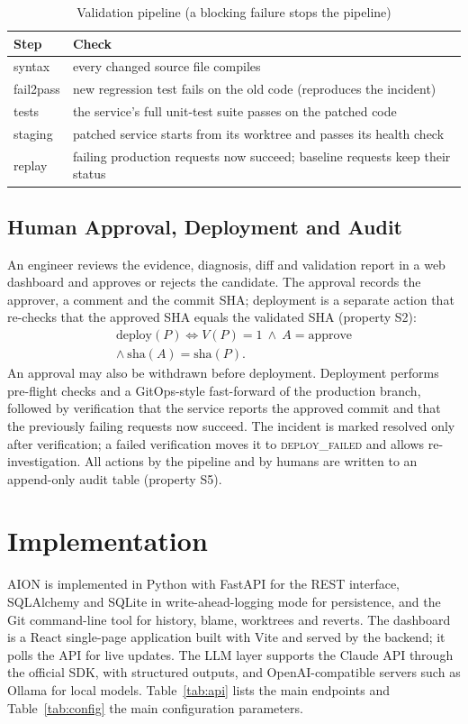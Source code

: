 \documentclass[conference]{IEEEtran}
\begin{document}
\begin{table}[t]
\centering
\caption{Validation pipeline (a blocking failure stops the pipeline)}
\label{tab:valsteps}
\footnotesize
\begin{tabular}{@{}p{2.0cm}p{5.7cm}@{}}
\toprule
Step & Check \\
\midrule
syntax & every changed source file compiles \\
fail2pass & new regression test fails on the old code (reproduces the incident) \\
tests & the service's full unit-test suite passes on the patched code \\
staging & patched service starts from its worktree and passes its health check \\
replay & failing production requests now succeed; baseline requests keep their status \\
\bottomrule
\end{tabular}
\end{table}

\subsection{Human Approval, Deployment and Audit}
\label{sec:deploy}
An engineer reviews the evidence, diagnosis, diff and validation report in a web dashboard and approves or rejects the candidate. The approval records the approver, a comment and the commit SHA; deployment is a separate action that re-checks that the approved SHA equals the validated SHA (property S2):
\begin{multline}
\text{deploy}(P) \iff V(P)=1 \ \wedge\ A=\text{approve} \\
\wedge\ \text{sha}(A)=\text{sha}(P).
\end{multline}
An approval may also be withdrawn before deployment. Deployment performs pre-flight checks and a GitOps-style fast-forward of the production branch, followed by verification that the service reports the approved commit and that the previously failing requests now succeed. The incident is marked resolved only after verification; a failed verification moves it to \textsc{deploy\_failed} and allows re-investigation. All actions by the pipeline and by humans are written to an append-only audit table (property S5).

\section{Implementation}
\label{sec:impl}
AION is implemented in Python with FastAPI for the REST interface, SQLAlchemy and SQLite in write-ahead-logging mode for persistence, and the Git command-line tool for history, blame, worktrees and reverts. The dashboard is a React single-page application built with Vite and served by the backend; it polls the API for live updates. The LLM layer supports the Claude API through the official SDK, with structured outputs, and OpenAI-compatible servers such as Ollama for local models. Table~\ref{tab:api} lists the main endpoints and Table~\ref{tab:config} the main configuration parameters.
\end{document}
